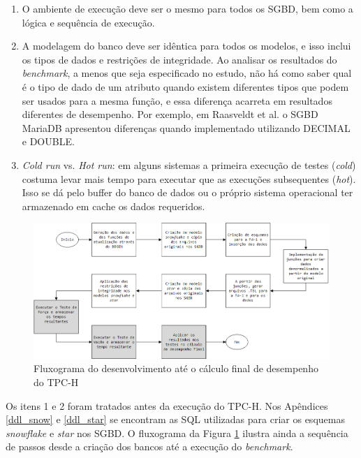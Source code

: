 \begin{enumerate}
    \item{O ambiente de execução 
    deve ser o mesmo para todos os SGBD, bem como a lógica e sequência de 
    execução.}
    \item{A modelagem do banco deve ser idêntica para todos os modelos, e isso 
    inclui os tipos de dados e restrições de integridade. Ao analisar os resultados do \textit{benchmark}, a menos 
    que seja especificado no estudo, não há como saber qual é o tipo de dado de um atributo 
    quando existem diferentes tipos que podem ser usados para a mesma função, 
    e essa diferença acarreta em resultados diferentes de desempenho. Por exemplo, 
    em Raasveldt et al. \cite{raasveldt2018fair} o SGBD MariaDB apresentou diferenças quando implementado 
    utilizando DECIMAL e DOUBLE.}
    \item{\textit{Cold run} vs. \textit{Hot run}: em alguns sistemas a primeira execução de 
    testes (\textit{cold}) costuma levar mais tempo para executar que as execuções subsequentes (\textit{hot}). 
    Isso se dá pelo buffer do banco de dados ou o próprio sistema operacional ter armazenado em 
    cache os dados requeridos.}
\end{enumerate}

\begin{figure}[htpb]
	\centering
        \includegraphics[width=\textwidth]{flux}
	\caption{Fluxograma do desenvolvimento até o cálculo final de desempenho do TPC-H}
	\label{fig:flux}
\end{figure}

Os itens 1 e 2 foram tratados antes da execução do TPC-H. Nos Apêndices \ref{ddl_snow} e \ref{ddl_star} se encontram as SQL 
utilizadas para criar os esquemas \textit{snowflake} e \textit{star} nos SGBD. O fluxograma da Figura \ref{fig:flux} 
ilustra ainda a sequência de passos desde a criação dos bancos até a execução do \textit{benchmark}. 

